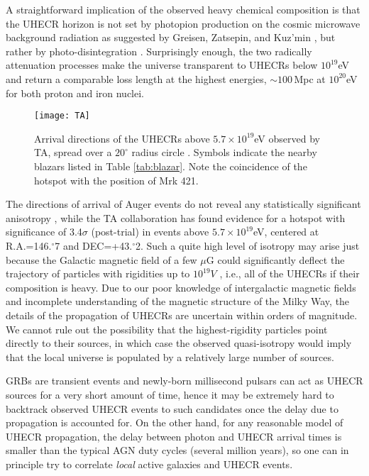 \documentclass[3p,times,twocolumn]{elsarticle}
\renewcommand{\deg}{^{\circ}}
\newcommand\fdg{\mbox{$.\!\!^\circ$}}
\begin{document}
A straightforward implication of the observed heavy chemical composition is that the UHECR horizon is not set by photopion production on the cosmic microwave background radiation as suggested by Greisen, Zatsepin, and Kuz'min \cite{greisen66,ZK66}, but rather by photo-disintegration \cite[see, e.g.,][]{abb14,Dermer07,ko11}.
Surprisingly enough, the two radically attenuation processes make the universe transparent to UHECRs below $10^{19}$eV and return a comparable loss length at the highest energies, $\sim 100$\,Mpc at $10^{20}$eV for both proton and iron nuclei.

\begin{figure}[htbp]
\begin{center}
\texttt{[image: TA]}
\caption{Arrival directions of the UHECRs above $5.7\times 10^{19}$eV observed by TA, spread over a $20\deg$ radius circle \citep[From ref.][]{TAhotspot}. Symbols indicate the nearby blazars listed in Table \ref{tab:blazar}. Note the coincidence of the hotspot with the position of Mrk 421.}
\label{fig:TA}
\end{center}
\end{figure}


The directions of arrival of Auger events do not reveal any statistically significant anisotropy \citep{auger13}, while the TA collaboration has found evidence for a hotspot with significance of 3.4$\sigma$ (post-trial) in events above $5.7\times 10^{19}$eV, centered at R.A.=146\fdg 7 and DEC=+43\fdg 2.
Such a quite high level of isotropy may arise just because the Galactic magnetic field of a few $\mu$G could significantly deflect the trajectory of particles with rigidities up to $10^{19}V$ \citep{zirakashvili+98}, i.e., all of the UHECRs if their composition is heavy.
Due to our poor knowledge of intergalactic magnetic fields and incomplete understanding of the magnetic structure of the Milky Way, the details of the propagation of UHECRs are uncertain within orders of magnitude.
We cannot rule out the possibility that the highest-rigidity particles point directly to their sources, in which case the observed quasi-isotropy would imply that the local universe is populated by a relatively large number of sources.

GRBs are transient events and newly-born millisecond pulsars can act as UHECR sources for a very short amount of time, hence it may be extremely hard to backtrack observed UHECR events to such candidates once the delay due to propagation is accounted for. 
On the other hand, for any reasonable model of UHECR propagation, the delay between photon and UHECR arrival times is smaller than the typical AGN duty cycles (several million years), so one can in principle try to correlate \emph{local} active galaxies and UHECR events.
\end{document}
